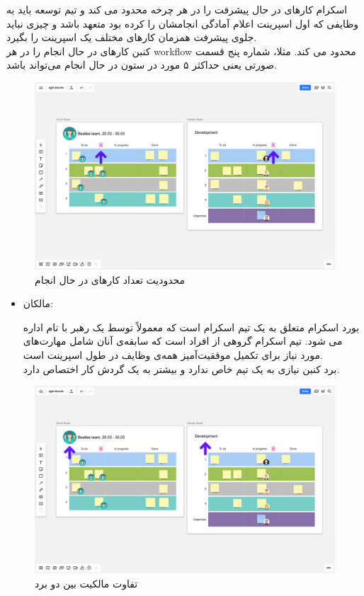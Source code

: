 {\begin{itemize}
اسکرام کار‌های در حال پیشرفت را در هر چرخه محدود می کند و تیم توسعه باید به وظایفی که اول اسپرینت اعلام آمادگی انجامشان را کرده بود متعهد باشد و چیزی نباید جلوی پیشرفت همزمان کارهای مختلف یک اسپرینت را بگیرد.\\

کنبن کارهای در حال انجام را در هر workflow محدود می کند. مثلا، شماره پنج قسمت صورتی یعنی حداکثر ۵ مورد در ستون در حال انجام می‌تواند باشد.
\end{itemize}

\begin{figure}
	\centering
	\includegraphics[scale=0.3]{figs/4-2-a}
	\caption{محدودیت تعداد کار‌های در حال انجام}
\end{figure}

\begin{itemize}
\item مالکان:

بورد اسکرام متعلق به یک تیم اسکرام است که معمولاً توسط یک رهبر با نام  اداره می شود. تیم اسکرام گروهی از افراد است که سابقه‌ی آنان شامل مهارت‌های مورد نیاز برای تکمیل موفقیت‌آمیز همه‌ی وظایف در طول اسپرینت است.
\\
برد کنبن نیازی به یک تیم خاص ندارد و بیشتر به یک گردش کار اختصاص دارد.

\end{itemize}

\begin{figure}
	\centering
	\includegraphics[scale=0.3]{figs/4-2-b}
	\caption{تفاوت مالکیت بین دو برد}
\end{figure}


}
